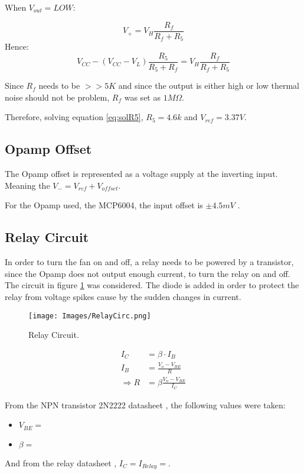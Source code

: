 When $V_{out} = LOW$:

\begin{equation}
    V_+ = V_H\frac{R_f}{R_f + R_5}
\end{equation}
Hence:
\begin{equation}
    V_{CC}-\left (V_{CC}-V_L\right )\frac{R_5}{R_5 + R_f} = V_H\frac{R_f}{R_f + R_5}
    \label{eq:solR5}
\end{equation}

Since $R_f$ needs to be $>>5K$ and since the output is either high or low thermal noise should not be problem, $R_f$ was set as $1M\Omega$. 

Therefore, solving equation \ref{eq:solR5}, $R_5 = 4.6k$ and $V_{ref} = 3.37V$.
\subsection{Opamp Offset}

The Opamp offset is represented as a voltage supply at the inverting input. Meaning the  $V_{-} = V_{ref} + V_{offset}$.

For the Opamp used, the MCP6004, the input offset is $\pm 4.5mV$ \textsuperscript{\cite{MCP6001_datasheet}}. 

\subsection{Relay Circuit}
In order to turn the fan on and off, a relay needs to be powered by a transistor, since the Opamp does not output enough current, to turn the relay on and off. The circuit in figure \ref{fig:RelayCirc} was considered. The diode is added in order to protect the relay from voltage spikes cause by the sudden changes in current.

\begin{figure}[H]
    \centering
    \texttt{[image: Images/RelayCirc.png]}
    \caption{Relay Circuit.}
    \label{fig:RelayCirc}
\end{figure}

\begin{equation}
    \begin{aligned}
        I_C &= \beta \cdot I_B\\
        I_B &= \frac{V_o - V_{BE}}{R}\\ 
        \Rightarrow R &= \beta \frac{V_o - V_{BE}}{I_C}
    \end{aligned}
\end{equation}

From the NPN transistor 2N2222 datasheet \textsuperscript{\cite{2N2222_datasheet}}, the following values were taken:
\begin{itemize}
    \item $V_{BE} = $
    \item $\beta = $
\end{itemize}
And from the relay datasheet \textsuperscript{\cite{ST2-DC5V-F_datasheet}}, $I_C = I_{Relay} = $.

